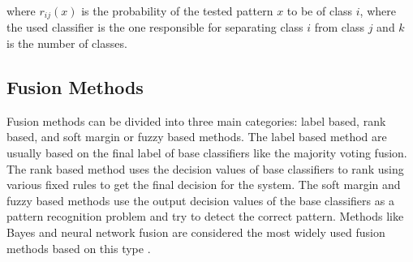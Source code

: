 \documentclass[conference]{IEEEtran}
\begin{document}
where $r_{ij}(x)$   is the probability of the tested pattern $x$ to be of class $i$, where the used classifier is the one responsible for separating class $i$ from class $j$  and $k$ is the number of classes.
%



\subsection{Fusion Methods}
Fusion methods can be divided into three main categories: label based, rank based, and soft margin or fuzzy based methods. The label based method are usually based on the final label of base classifiers like the majority voting fusion. The rank based method uses the decision values of base classifiers to rank using various fixed rules to get the final decision for the system. The soft margin and fuzzy based methods use the output decision values of the base classifiers as a pattern recognition problem and try to detect the correct pattern. Methods like Bayes and neural network fusion are considered the most widely used fusion methods based on this type  \cite{Farah2005,Ruta2000,Denoeux2000}.

\end{document}

